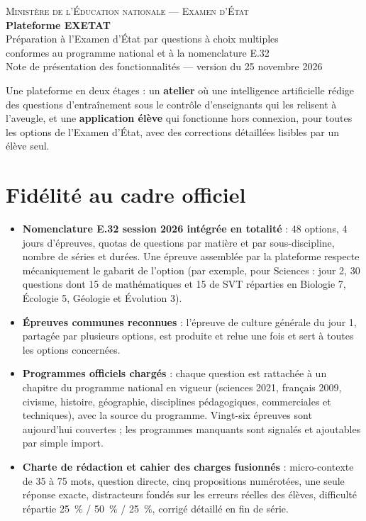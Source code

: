 \documentclass[11pt,a4paper]{article}
\begin{document}
\begin{center}
  {\color{or}\small\scshape Ministère de l'Éducation nationale — Examen d'État}\\[6pt]
  {\color{nuit}\LARGE\bfseries Plateforme EXETAT}\\[4pt]
  {\color{nuit}\large Préparation à l'Examen d'État par questions à choix multiples\\ conformes au programme national et à la nomenclature E.32}\\[6pt]
  {\color{encre2}\small Note de présentation des fonctionnalités — version du 25 novembre 2026}
\end{center}

\vspace{6pt}
\begin{encadre}[title=En une phrase]
Une plateforme en deux étages : un \textbf{atelier} où une intelligence artificielle rédige des questions d'entraînement sous le contrôle d'enseignants qui les relisent à l'aveugle, et une \textbf{application élève} qui fonctionne hors connexion, pour toutes les options de l'Examen d'État, avec des corrections détaillées lisibles par un élève seul.
\end{encadre}

\section{Fidélité au cadre officiel}

\begin{itemize}
  \item \textbf{Nomenclature E.32 session 2026 intégrée en totalité} : 48 options, 4 jours d'épreuves, quotas de questions par matière et par sous-discipline, nombre de séries et durées. Une épreuve assemblée par la plateforme respecte mécaniquement le gabarit de l'option (par exemple, pour Sciences : jour 2, 30 questions dont 15 de mathématiques et 15 de SVT réparties en Biologie 7, Écologie 5, Géologie et Évolution 3).
  \item \textbf{Épreuves communes reconnues} : l'épreuve de culture générale du jour 1, partagée par plusieurs options, est produite et relue une fois et sert à toutes les options concernées.
  \item \textbf{Programmes officiels chargés} : chaque question est rattachée à un chapitre du programme national en vigueur (sciences 2021, français 2009, civisme, histoire, géographie, disciplines pédagogiques, commerciales et techniques), avec la source du programme. Vingt-six épreuves sont aujourd'hui couvertes ; les programmes manquants sont signalés et ajoutables par simple import.
  \item \textbf{Charte de rédaction et cahier des charges fusionnés} : micro-contexte de 35 à 75 mots, question directe, cinq propositions numérotées, une seule réponse exacte, distracteurs fondés sur les erreurs réelles des élèves, difficulté répartie 25~\% / 50~\% / 25~\%, corrigé détaillé en fin de série.
\end{itemize}
\end{document}
